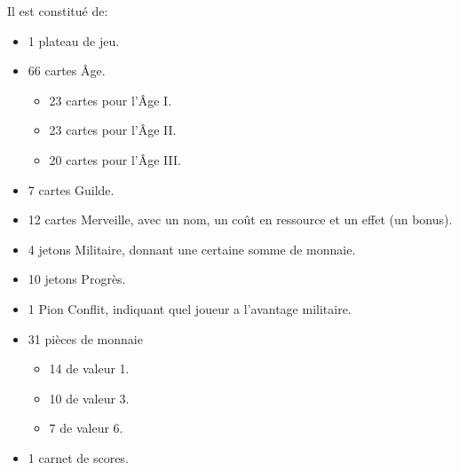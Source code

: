 \documentclass[a4paper, 12pt, french]{article}
\begin{document}
	Il est constitué de:
	\begin{itemize}
		\item 1 plateau de jeu.
		\item 66 cartes Âge.
		\begin{itemize}
			\item 23 cartes pour l'Âge I.
			\item 23 cartes pour l'Âge II.
			\item 20 cartes pour l'Âge III.
		\end{itemize}
		\item 7 cartes Guilde.
		\item 12 cartes Merveille, avec un nom, un coût en ressource et un effet (un bonus).
		\item 4 jetons Militaire, donnant une certaine somme de monnaie.
		\item 10 jetons Progrès.
		\item 1 Pion Conflit, indiquant quel joueur a l'avantage militaire.
		\item 31 pièces de monnaie
		\begin{itemize}
			\item 14 de valeur 1.
			\item 10 de valeur 3.
			\item 7 de valeur 6.
		\end{itemize}
		\item 1 carnet de scores.
	\end{itemize}
\end{document}
